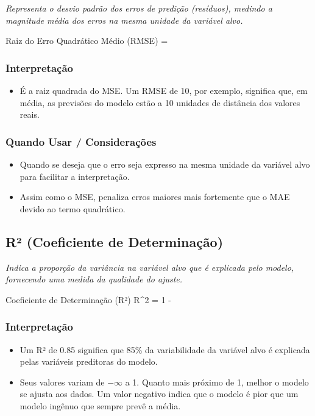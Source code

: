 \textit{Representa o desvio padrão dos erros de predição (resíduos), medindo a magnitude média dos erros na mesma unidade da variável alvo.}

\begin{equacaodestaque}{Raiz do Erro Quadrático Médio (RMSE)}
     = 
\end{equacaodestaque}

\subsubsection*{Interpretação}
\begin{itemize}
    \item É a raiz quadrada do MSE. Um RMSE de 10, por exemplo, significa que, em média, as previsões do modelo estão a 10 unidades de distância dos valores reais.
\end{itemize}

\subsubsection*{Quando Usar / Considerações}
\begin{itemize}
    \item Quando se deseja que o erro seja expresso na mesma unidade da variável alvo para facilitar a interpretação.
    \item Assim como o MSE, penaliza erros maiores mais fortemente que o MAE devido ao termo quadrático.
\end{itemize}

\subsection{R² (Coeficiente de Determinação)}

\textit{Indica a proporção da variância na variável alvo que é explicada pelo modelo, fornecendo uma medida da qualidade do ajuste.}

\begin{equacaodestaque}{Coeficiente de Determinação (R²)}
    R^2 = 1 - 
\end{equacaodestaque}

\subsubsection*{Interpretação}
\begin{itemize}
    \item Um R² de 0.85 significa que 85\% da variabilidade da variável alvo é explicada pelas variáveis preditoras do modelo.
    \item Seus valores variam de $-\infty$ a 1. Quanto mais próximo de 1, melhor o modelo se ajusta aos dados. Um valor negativo indica que o modelo é pior que um modelo ingênuo que sempre prevê a média.
\end{itemize}

